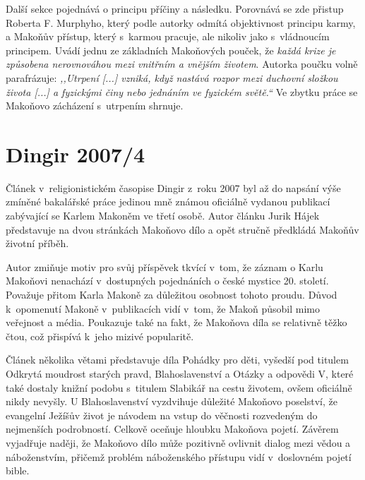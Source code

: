 Další sekce pojednává o principu příčiny a následku. Porovnává se zde přistup
Roberta F. Murphyho, který podle autorky odmítá objektivnost principu karmy, a
Makoňův přístup, který s~karmou pracuje, ale nikoliv jako s~vládnoucím
principem. Uvádí jednu ze základních Makoňových pouček, že \textit{každá krize
je způsobena nerovnováhou mezi vnitřním a vnějším životem}. Autorka poučku volně
parafrázuje: \textit{,,Utrpení [...] vzniká, když nastává rozpor mezi duchovní
složkou života [...] a fyzickými činy nebo jednáním ve fyzickém světě.``}
Ve zbytku práce se Makoňovo zácházení s~utrpením shrnuje.

\section{Dingir 2007/4}

Článek v~religionistickém časopise Dingir z~roku 2007\cite{hajek2007cesky} byl
až do napsání výše zmíněné bakalářské práce jedinou mně známou oficiálně vydanou
publikací zabývající se Karlem Makoněm ve třetí osobě. Autor článku Jurik Hájek
představuje na dvou stránkách Makoňovo dílo a opět stručně předkládá Makoňův
životní příběh.

Autor zmiňuje motiv pro svůj příspěvek tkvící v~tom, že záznam o Karlu Makoňovi
nenachází v~dostupných pojednáních o české mystice 20. století. Považuje přitom
Karla Makoně za důležitou osobnost tohoto proudu. Důvod k~opomenutí Makoně
v~publikacích vidí v~tom, že Makoň působil mimo veřejnost a média. Poukazuje
také na fakt, že Makoňova díla se relativně těžko čtou, což přispívá k~jeho
mizivé popularitě.

Článek několika větami představuje díla Pohádky pro děti, vyšedší pod titulem
Odkrytá moudrost starých pravd\cite{makon1992odkryta},
Blahoslavenství\cite{makon2000blahoslavenstvi} a Otázky a odpovědi V, které
také dostaly knižní podobu s~titulem Slabikář na cestu životem, ovšem oficiálně
nikdy nevyšly. U Blahoslavenství vyzdvihuje důležité Makoňovo poselství, že
evangelní Ježíšův život je návodem na vstup do věčnosti rozvedeným do nejmenších
podrobností. Celkově oceňuje hloubku Makoňova pojetí. Závěrem vyjadřuje naději,
že Makoňovo dílo může pozitivně ovlivnit dialog mezi vědou a náboženstvím,
přičemž problém náboženského přístupu vidí v~doslovném pojetí bible.

